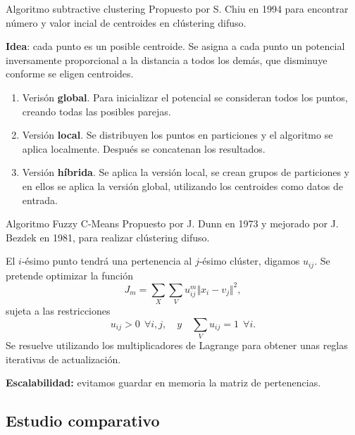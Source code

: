 \documentclass[10pt, spanish]{beamer}
\begin{document}
\begin{frame}{Algoritmo subtractive clustering}
  Propuesto por S. Chiu en 1994 para encontrar número y valor incial de centroides en clústering difuso.

  \textbf{Idea}: cada punto es un posible centroide. Se asigna a cada punto un potencial inversamente proporcional a la distancia a todos los demás, que disminuye conforme se eligen centroides.

  \begin{enumerate}
    \item Verisón \textbf{global}. Para inicializar el potencial se consideran todos los puntos, creando todas las posibles parejas.
    \item Versión \textbf{local}. Se distribuyen los puntos en particiones y el algoritmo se aplica localmente. Después se concatenan los resultados.
    \item Versión \textbf{híbrida}. Se aplica la versión local, se crean grupos de particiones y en ellos se aplica la versión global, utilizando los centroides como datos de entrada.
  \end{enumerate}

\end{frame}

\begin{frame}{Algoritmo Fuzzy C-Means}
  Propuesto por J. Dunn en 1973 y mejorado por J. Bezdek en 1981, para realizar clústering difuso.

  El $i$-ésimo punto tendrá una pertenencia al $j$-ésimo clúster, digamos $u_{ij}$. Se pretende optimizar la función
  \[
    J_m = \sum_{X}\sum_{V} u_{ij}^m\Vert x_i - v_j \Vert^2,
  \]
  sujeta a las restricciones
  \[
    u_{ij}>0 \ \ \forall i, j, \quad y \quad \sum_{V}u_{ij} =1 \ \ \forall i.
  \]
  Se resuelve utilizando los multiplicadores de Lagrange para obtener unas reglas iterativas de actualización.

  \textbf{Escalabilidad:} evitamos guardar en memoria la matriz de pertenencias.
\end{frame}

\subsection{Estudio comparativo}
\end{document}
